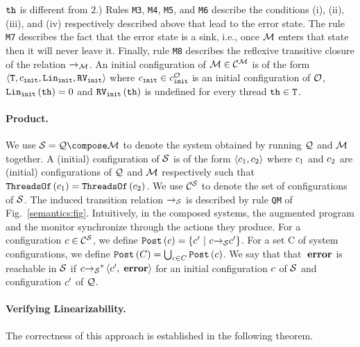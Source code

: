 ${\tt th}$ is different from $2$.)
%
Rules 
{\tt M3},
{\tt M4},
{\tt M5}, and
{\tt M6}
describe the conditions (i), (ii), (iii), and (iv)
respectively described
above that lead to the error state.
%
The rule {\tt M7} describes the fact that the error state is a sink,
i.e., once ${\mathcal M}$ enters that state then it will never leave it.
%
Finally, rule {\tt M8} describes the reflexive transitive closure of
the relation ${\xrightarrow{}{}}_{\!\!{\mathcal M}}$.
%
An initial configuration of ${\mathcal M}\in{\mathcal C}^{{\mathcal M}}$
is of the form $\left\langle{\tt T},c_{\tt init},{\tt Lin}_{\tt init},{\tt RV}_{\tt init}\right\rangle$
where $c_{\tt init}\in c_{\tt init}^{{\mathcal O}}$ is an initial 
configuration of ${\mathcal O}$,
${\tt Lin}_{\tt init}\left({\tt th}\right)=0$ and 
${\tt RV}_{\tt init}\left({\tt th}\right)$ is undefined for every thread ${\tt th}\in{\tt T}$.

\paragraph{Product.}
We use $\system=\augprog\compose\monitor$ to denote the system obtained by
running ${\mathcal Q}$ and ${\mathcal M}$ together.
%
A (initial) configuration of ${\mathcal S}$ is of the form
$\left\langle c_1,c_2\right\rangle$ where $c_1$ and $c_2$
are (initial) configurations of ${\mathcal Q}$ and ${\mathcal M}$ respectively
such that ${\tt ThreadsOf}\left(c_1\right)={\tt ThreadsOf}\left(c_2\right)$.
%
%
We use ${\mathcal C}^{{\mathcal S}}$ 
to denote the set of configurations
of ${\mathcal S}$.
%
The induced transition relation ${\xrightarrow{}{}}_{\!\!{\mathcal S}}$
is described by
rule {\tt QM} of Fig.~\ref{semantics:fig}.
%
Intuitively, in the composed systems, the augmented program and the monitor
synchronize through the actions they produce.
%
For a configuration $c\in{\mathcal C}^{{\mathcal S}}$, we define
${\tt Post}\left(c\right)=\left\{c'\ | \ c{\xrightarrow{}{}}_{\!\!{\mathcal S}}c'\right\}$. For a set C of system configurations, we define ${\tt Post}\left(C\right) = \bigcup_{c \in C} {\tt Post}\left(c\right)$. 
We say that that $\;{\bf error}$ is reachable in 
${\mathcal S}$ if
$c{{\xrightarrow{}{}}_{\!\!{\mathcal S}}}^*\left\langle c',\;{\bf error}\right\rangle$
for an initial configuration $c$ of 
${\mathcal S}$ and configuration $c'$ of ${\mathcal Q}$.

\paragraph{Verifying Linearizability.}
The correctness of this approach is established in the following theorem.

